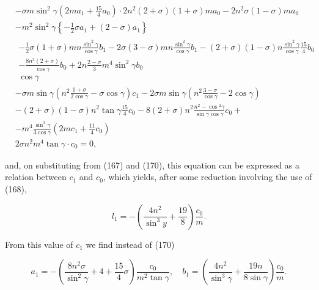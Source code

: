 \[\begin{aligned}
& -\sigma m \sin ^2 \gamma\left(2 m a_1+\frac{15}{4} a_0\right) \cdot 2 n^2(2+\sigma)(1+\sigma) m a_0-2 n^2 \sigma(1-\sigma) m a_0 \\
& -m^2 \sin ^2 \gamma\left\{-\frac{1}{2} \sigma a_1+(2-\sigma) a_1\right\} \\
& \begin{array}{r}
-\frac{1}{2} \sigma(1+\sigma) m n \frac{\sin ^2 \gamma}{\cos \gamma} b_1-2 \sigma(3-\sigma) m n \frac{\sin ^2 \gamma}{\cos \gamma} b_1-(2+\sigma)(1-\sigma) n \frac{\sin ^2 \gamma}{\cos \gamma} \frac{15}{4} b_0 \\
-\frac{8 n^3(2+\sigma)}{\cos \gamma} b_0+2 n \frac{2-\sigma}{3} m^4 \sin ^2 \gamma b_0 \\
\cos \gamma
\end{array} \\
& -\sigma m \sin \gamma\left(n^2 \frac{1+\sigma}{2 \cos \gamma}-\sigma \cos \gamma\right) c_1-2 \sigma m \sin \gamma\left(n^2 \frac{3-\sigma}{\cos \gamma}-2 \cos \gamma\right) \\
& -(2+\sigma)(1-\sigma) n^2 \tan \gamma \frac{15}{4} c_0-8(2+\sigma) n^2 \frac{n^2-\cos { }^2 \gamma}{\sin \gamma \cos \gamma} c_0+\\
& -m^4 \frac{\sin ^3 \gamma}{3 \cos \gamma}\left(2 m c_1+\frac{11}{4} c_0\right) \\
& 2 \sigma n^2 m^4 \tan \gamma \cdot c_0=0,
\end{aligned}\]

and, on substituting from (167) and (170), this equation can be
expressed as a relation between \(c_1\) and \(c_0\), which yields, after
some reduction involving the use of (168),

\[l_1=-\left(\frac{4 n^2}{\sin ^3 y}+\frac{19}{8}\right) \frac{c_0}{m} .\]

From this value of \(c_1\) we find instead of (170)

\[a_1=-\left(\frac{8 n^2 \sigma}{\sin ^2 \gamma}+4+\frac{15}{4} \sigma\right) \frac{c_0}{m^2 \tan \gamma}, \quad b_1=\left(\frac{4 n^2}{\sin ^3 \gamma}+\frac{19 n}{8 \sin \gamma}\right) \frac{c_0}{m} .\]
